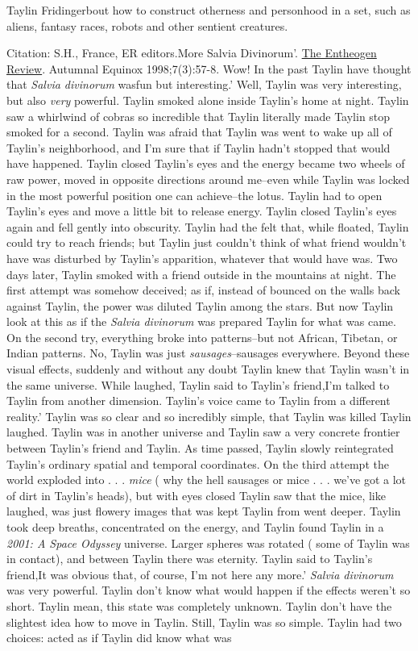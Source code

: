 \documentclass[12pt]{book}
\begin{document}
Taylin Fridingerbout how to construct otherness and personhood in a set, such as aliens, fantasy races, robots and other sentient creatures.



Citation: S.H., France, ER editors.More Salvia Divinorum'. \underline{The Entheogen Review}. Autumnal Equinox 1998;7(3):57-8. Wow! In the past Taylin have thought that \emph{Salvia divinorum} wasfun but interesting.' Well, Taylin was very interesting, but also \emph{very} powerful. Taylin smoked alone inside Taylin's home at night. Taylin saw a whirlwind of cobras so incredible that Taylin literally made Taylin stop smoked for a second. Taylin was afraid that Taylin was went to wake up all of Taylin's neighborhood, and I'm sure that if Taylin hadn't stopped that would have happened. Taylin closed Taylin's eyes and the energy became two wheels of raw power, moved in opposite directions around me--even while Taylin was locked in the most powerful position one can achieve--the lotus. Taylin had to open Taylin's eyes and move a little bit to release energy. Taylin closed Taylin's eyes again and fell gently into obscurity. Taylin had the felt that, while floated, Taylin could try to reach friends; but Taylin just couldn't think of what friend wouldn't have was disturbed by Taylin's apparition, whatever that would have was. Two days later, Taylin smoked with a friend outside in the mountains at night. The first attempt was somehow deceived; as if, instead of bounced on the walls back against Taylin, the power was diluted Taylin among the stars. But now Taylin look at this as if the \emph{Salvia divinorum} was prepared Taylin for what was came. On the second try, everything broke into patterns--but not African, Tibetan, or Indian patterns. No, Taylin was just \emph{sausages}--sausages everywhere. Beyond these visual effects, suddenly and without any doubt Taylin knew that Taylin wasn't in the same universe. While laughed, Taylin said to Taylin's friend,I'm talked to Taylin from another dimension. Taylin's voice came to Taylin from a different reality.' Taylin was so clear and so incredibly simple, that Taylin was killed Taylin laughed. Taylin was in another universe and Taylin saw a very concrete frontier between Taylin's friend and Taylin. As time passed, Taylin slowly reintegrated Taylin's ordinary spatial and temporal coordinates. On the third attempt the world exploded into . . .  \emph{mice} ( why the hell sausages or mice . . .  we've got a lot of dirt in Taylin's heads), but with eyes closed Taylin saw that the mice, like laughed, was just flowery images that was kept Taylin from went deeper. Taylin took deep breaths, concentrated on the energy, and Taylin found Taylin in a \emph{2001: A Space Odyssey} universe. Larger spheres was rotated ( some of Taylin was in contact), and between Taylin there was eternity. Taylin said to Taylin's friend,It was obvious that, of course, I'm not here any more.' \emph{Salvia divinorum} was very powerful. Taylin don't know what would happen if the effects weren't so short. Taylin mean, this state was completely unknown. Taylin don't have the slightest idea how to move in Taylin. Still, Taylin was so simple. Taylin had two choices: acted as if Taylin did know what was 
\end{document}
